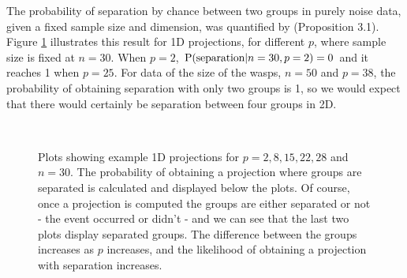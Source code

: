 The probability of separation by chance between two groups in purely noise data, given a fixed sample size and dimension,  was quantified by \cite{ripley:1996} (Proposition 3.1). Figure \ref{dist_1d} illustrates this result for 1D projections, for different $p$, where sample size is fixed at $n = 30$. When $p = 2$, $\hbox{P(separation}|n = 30, p = 2) = 0$ and it reaches 1 when $p = 25$. For data of the size of the wasps, $n = 50$ and $p = 38$, the probability of obtaining separation with only two groups is 1, so we would expect that there would certainly be separation between four groups in 2D.

\begin{figure}[htbp]
\centering
\mbox{\quad
{}\quad
{}\quad
{}\quad
{}}
\caption{Plots showing example 1D projections for $p=2, 8, 15, 22, 28$ and $n = 30$. The probability of obtaining a projection where groups are separated is calculated and displayed below the plots. Of course, once a projection is computed the groups are either separated or not - the event occurred or didn't - and we can see that the last two plots display separated groups. The difference between the groups increases as $p$ increases, and the likelihood of obtaining a projection with separation increases.} 
\label{dist_1d}
\end{figure}

